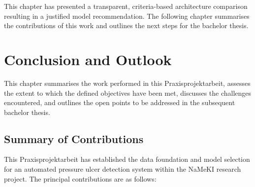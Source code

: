 \documentclass[a4paper,12pt,twoside]{report}
\begin{document}
This chapter has presented a transparent, criteria-based architecture comparison
resulting in a justified model recommendation. The following chapter summarises
the contributions of this work and outlines the next steps for the bachelor
thesis.

\chapter{Conclusion and Outlook}
\label{ch:conclusion}

This chapter summarises the work performed in this Praxisprojektarbeit, assesses
the extent to which the defined objectives have been met, discusses the
challenges encountered, and outlines the open points to be addressed in the
subsequent bachelor thesis.

\section{Summary of Contributions}
\label{sec:contributions}

This Praxisprojektarbeit has established the data foundation and model selection
for an automated pressure ulcer detection system within the NaMeKI research
project. The principal contributions are as follows:
\end{document}
